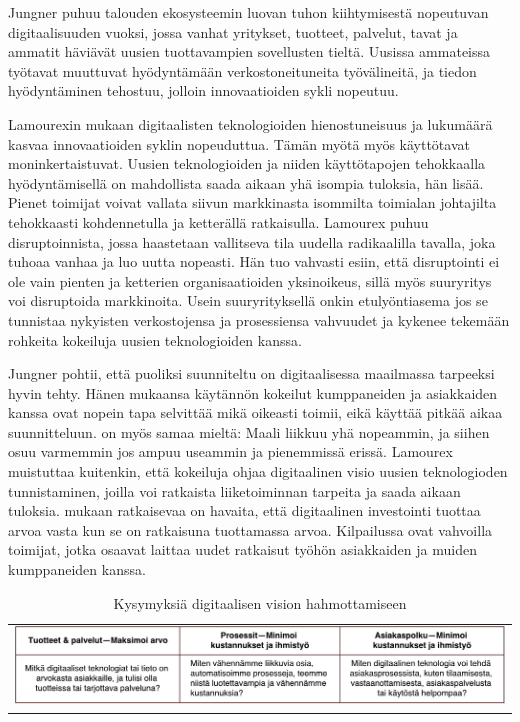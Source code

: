 \documentclass[finnish,12pt,a4paper,pdftex]{article}
\begin{document}
Jungner \citeyearpar{jungner} puhuu talouden ekosysteemin luovan tuhon kiihtymisestä nopeutuvan digitaalisuuden vuoksi, jossa vanhat yritykset, tuotteet, palvelut, tavat ja ammatit häviävät uusien tuottavampien sovellusten tieltä. Uusissa ammateissa työtavat muuttuvat hyödyntämään verkostoneituneita työvälineitä, ja tiedon hyödyntäminen tehostuu, jolloin innovaatioiden sykli nopeutuu. 

Lamourexin \citeyearpar{lamoureux} mukaan digitaalisten teknologioiden hienostuneisuus ja lukumäärä kasvaa innovaatioiden syklin nopeuduttua. Tämän myötä myös käyttötavat moninkertaistuvat. Uusien teknologioiden ja niiden käyttötapojen tehokkaalla hyödyntämisellä on mahdollista saada aikaan yhä isompia tuloksia, hän lisää. Pienet toimijat voivat vallata siivun markkinasta isommilta toimialan johtajilta tehokkaasti kohdennetulla ja ketterällä ratkaisulla. Lamourex \citeyearpar{lamoureux} puhuu disruptoinnista, jossa haastetaan vallitseva tila uudella radikaalilla tavalla, joka tuhoaa vanhaa ja luo uutta nopeasti. Hän tuo vahvasti esiin, että disruptointi ei ole vain pienten ja ketterien organisaatioiden yksinoikeus, sillä myös suuryritys voi disruptoida markkinoita. Usein suuryrityksellä onkin etulyöntiasema jos se tunnistaa nykyisten verkostojensa ja prosessiensa vahvuudet ja kykenee tekemään rohkeita kokeiluja uusien teknologioiden kanssa. 

Jungner \citeyearpar{jungner} pohtii, että puoliksi suunniteltu on digitaalisessa maailmassa tarpeeksi hyvin tehty. Hänen mukaansa käytännön kokeilut kumppaneiden ja asiakkaiden kanssa ovat nopein tapa selvittää mikä oikeasti toimii, eikä käyttää pitkää aikaa suunnitteluun. \citeauthor{devops} \citeyearpar{devops} on myös samaa mieltä: Maali liikkuu yhä nopeammin, ja siihen osuu varmemmin jos ampuu useammin ja pienemmissä erissä. Lamourex \citeyearpar{lamoureux} muistuttaa kuitenkin, että kokeiluja ohjaa digitaalinen visio uusien teknologioden tunnistaminen, joilla voi ratkaista liiketoiminnan tarpeita ja saada aikaan tuloksia. \citeauthor{gandhi} \citeyearpar{gandhi} mukaan ratkaisevaa on havaita, että digitaalinen investointi tuottaa arvoa vasta kun se on ratkaisuna tuottamassa arvoa. Kilpailussa ovat vahvoilla toimijat, jotka osaavat laittaa uudet ratkaisut työhön asiakkaiden ja muiden kumppaneiden kanssa.

\begin{table}[h!]
    \centering
    \begin{tabular}{l}
       \includegraphics[scale=0.45]{images/priorisointi.pdf}
    \end{tabular}
    \caption{Kysymyksiä digitaalisen vision hahmottamiseen \citep{lamoureux}}
    \label{tab:digkys}
\end{table}
\end{document}
